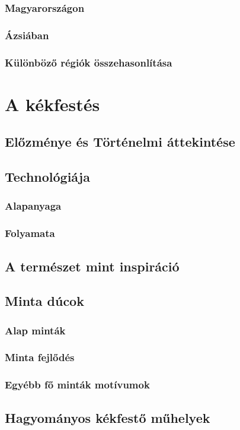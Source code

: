 \documentclass[fontsize=12pt, appendixprefix=true]{scrreprt}
\begin{document}
\subsection{Magyarországon}
\subsection{Ázsiában}
\subsection{Különböző régiók összehasonlítása}

\chapter{A kékfestés}
\section{Előzménye és Történelmi áttekintése}
\section{Technológiája}
\subsection{Alapanyaga}
\subsection{Folyamata}
\section{A természet mint inspiráció}
\section{Minta dúcok}
\subsection{Alap minták}
\subsection{Minta fejlődés}
\subsection{Egyébb fő minták motívumok}
\section{Hagyományos kékfestő műhelyek}
\end{document}
